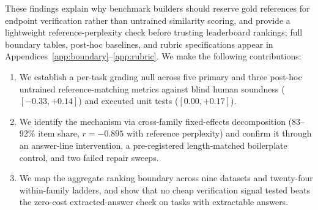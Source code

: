 These findings explain why benchmark builders should reserve gold references for endpoint verification rather than untrained similarity scoring, and provide a lightweight reference-perplexity check before trusting leaderboard rankings; full boundary tables, post-hoc baselines, and rubric specifications appear in Appendices~\ref{app:boundary}--\ref{app:rubric}.
We make the following contributions:
\begin{enumerate}
\item We establish a per-task grading null across five primary and three post-hoc untrained reference-matching metrics against blind human soundness ($[-0.33, +0.14]$) and executed unit tests ($[0.00, +0.17]$).
\item We identify the mechanism via cross-family fixed-effects decomposition ($83$--$92\%$ item share, $r = -0.895$ with reference perplexity) and confirm it through an answer-line intervention, a pre-registered length-matched boilerplate control, and two failed repair sweeps.
\item We map the aggregate ranking boundary across nine datasets and twenty-four within-family ladders, and show that no cheap verification signal tested beats the zero-cost extracted-answer check on tasks with extractable answers.
\end{enumerate}

